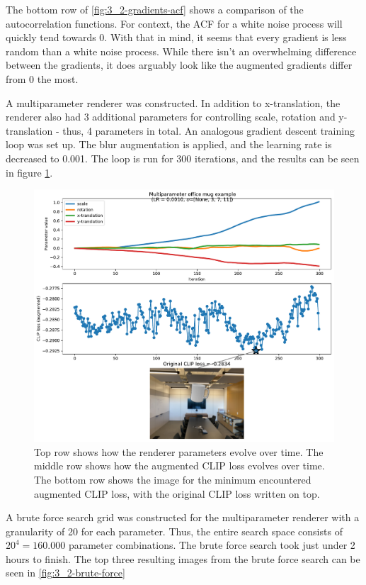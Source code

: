 The bottom row of \ref{fig:3_2-gradients-acf} shows a comparison of the autocorrelation functions. For context, the ACF for a white noise process will quickly tend towards 0. With that in mind, it seems that every gradient is less random than a white noise process. While there isn't an overwhelming difference between the gradients, it does arguably look like the augmented gradients differ from 0 the most.

A multiparameter renderer was constructed. In addition to x-translation, the renderer also had 3 additional parameters for controlling scale, rotation and y-translation - thus, 4 parameters in total. An analogous gradient descent training loop was set up. The blur augmentation is applied, and the learning rate is decreased to 0.001. The loop is run for 300 iterations, and the results can be seen in figure \ref{fig:3_2-multiparam-loss-graph}.

\begin{figure}[H]
    \centering
    \includegraphics[width=1.0\textwidth]{figures/3_2-multiparam-loss-graph.pdf}
    \caption{Top row shows how the renderer parameters evolve over time. The middle row shows how the augmented CLIP loss evolves over time. The bottom row shows the image for the minimum encountered augmented CLIP loss, with the original CLIP loss written on top.}
    \label{fig:3_2-multiparam-loss-graph}
\end{figure}


A brute force search grid was constructed for the multiparameter renderer with a granularity of 20 for each parameter. Thus, the entire search space consists of $20^4=160.000$ parameter combinations. The brute force search took just under 2 hours to finish. The top three resulting images from the brute force search can be seen in \ref{fig:3_2-brute-force}

